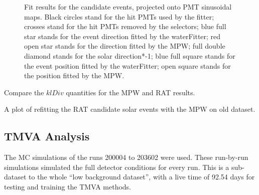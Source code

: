 \begin{figure}[htbp]
{\begin{minipage}[t]{0.4\textwidth}
		\end{minipage}
	}
	\caption{Fit results for the candidate events, projected onto PMT sinusoidal maps. Black circles stand for
		the hit PMTs used by the fitter; crosses stand for the hit PMTs removed by the selectors; blue full star stands for the event direction fitted by the waterFitter; red open star stands for the direction fitted by the MPW; full double diamond stands for the solar direction*-1; blue full square stands for the event position fitted by the waterFitter; open square stands for the position fitted by the MPW.}
	\label{openDataSetCandidate}
\end{figure}

Compare the $klDiv$ quantities for the MPW and RAT results. 

A plot of refitting the RAT candidate solar events with the MPW on old dataset.



\subsection{TMVA Analysis}
The MC simulations of the runs 200004 to 203602 were used. These run-by-run simulations simulated the full detector conditions for every run. This is a sub-dataset to the whole ``low background dataset'', with a live time of 92.54 days for testing and training the TMVA methods.

